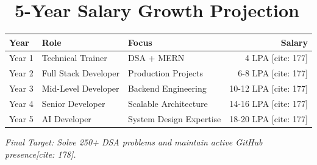 \documentclass[10pt,letterpaper]{article}
\begin{document}
\section{\faChartLine \ 5-Year Salary Growth Projection}
\begin{tabularx}{\textwidth}{l X l r}
    \rowcolor{gray!10} \textbf{Year} & \textbf{Role} & \textbf{Focus} & \textbf{Salary} \\ \hline
    Year 1 & Technical Trainer & DSA + MERN & 4 LPA [cite: 177] \\
    Year 2 & Full Stack Developer & Production Projects & 6-8 LPA [cite: 177] \\
    Year 3 & Mid-Level Developer & Backend Engineering & 10-12 LPA [cite: 177] \\
    Year 4 & Senior Developer & Scalable Architecture & 14-16 LPA [cite: 177] \\
    Year 5 & AI Developer & System Design Expertise & 18-20 LPA [cite: 177] \\
\end{tabularx}

\vspace{10pt}
\begin{center}
    \textit{\small Final Target: Solve 250+ DSA problems and maintain active GitHub presence[cite: 178].}
\end{center}
\end{document}
